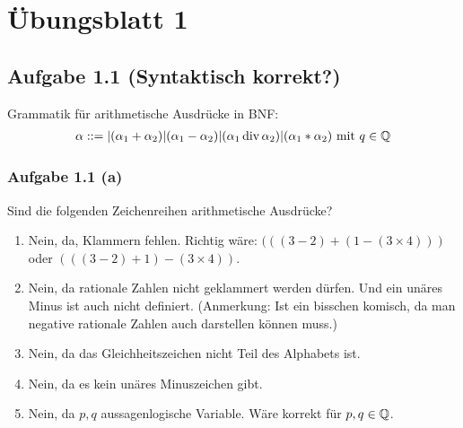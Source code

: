 
\section{Übungsblatt 1}

\subsection{Aufgabe 1.1 (Syntaktisch korrekt?)}
Grammatik für arithmetische Ausdrücke in BNF:
\begin{align*}
	\alpha::=|(\alpha_1+\alpha_2)|(\alpha_1-\alpha_2)|(\alpha_1\operatorname{div}\alpha_2)|(\alpha_1\ast\alpha_2)\text{ mit } q\in\mathbb{Q}
\end{align*}

\subsubsection{Aufgabe 1.1 (a)}
Sind die folgenden Zeichenreihen arithmetische Ausdrücke?
\begin{enumerate}[label=(\arabic*)]
	\item Nein, da, Klammern fehlen. Richtig wäre: $(((3-2)+(1-(3\times 4)))$ oder $(((3-2)+1)-(3\times 4))$.
	\item Nein, da rationale Zahlen nicht geklammert werden dürfen. Und ein unäres Minus ist auch nicht definiert. 
	(Anmerkung: Ist ein bisschen komisch, da man negative rationale Zahlen auch darstellen können muss.)
	\item Nein, da das Gleichheitszeichen nicht Teil des Alphabets ist.
	\item Nein, da es kein unäres Minuszeichen gibt.
	\item Nein, da $p,q$ aussagenlogische Variable. Wäre korrekt für $p,q\in\mathbb{Q}$.
\end{enumerate}

